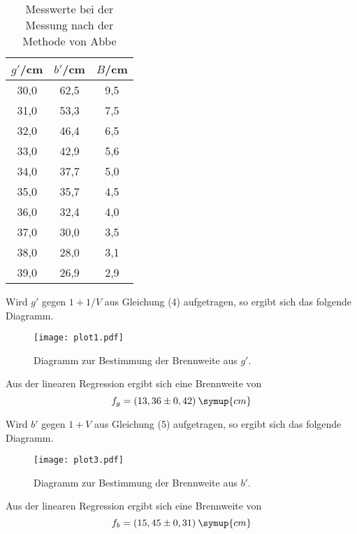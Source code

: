 \begin{table}[H]
  \centering
  \caption{Messwerte bei der Messung nach der Methode von Abbe}
  \label{tab:abbe}
  \begin{tabular}{c c c}
    \toprule
    $g'$/cm  & $b'$/cm & $B$/cm \\
    \midrule
    30,0  &  62,5  &  9,5 \\
    31,0  &  53,3  &  7,5 \\
    32,0  &  46,4  &  6,5 \\
    33,0  &  42,9  &  5,6 \\
    34,0  &  37,7  &  5,0 \\
    35,0  &  35,7  &  4,5 \\
    36,0  &  32,4  &  4,0 \\
    37,0  &  30,0  &  3,5 \\
    38,0  &  28,0  &  3,1 \\
    39,0  &  26,9  &  2,9 \\
    \bottomrule
  \end{tabular}
\end{table}

Wird $g'$ gegen $1+1/V$ aus Gleichung (4) aufgetragen, so ergibt sich das folgende Diagramm.

\begin{figure}[H]
  \centering
  \texttt{[image: plot1.pdf]}
  \caption{Diagramm zur Bestimmung der Brennweite aus $g'$.}
  \label{fig:plot1}
\end{figure}

Aus der linearen Regression ergibt sich eine Brennweite von
\begin{equation*}
  f_g = (13,36 \pm 0,42)\: \symup{cm}
\end{equation*}

Wird $b'$ gegen $1+V$ aus Gleichung (5) aufgetragen, so ergibt sich das folgende Diagramm.

\begin{figure}[H]
  \centering
  \texttt{[image: plot3.pdf]}
  \caption{Diagramm zur Bestimmung der Brennweite aus $b'$.}
  \label{fig:plot3}
\end{figure}

Aus der linearen Regression ergibt sich eine Brennweite von
\begin{equation*}
  f_b = (15,45 \pm 0,31)\: \symup{cm}
\end{equation*}
